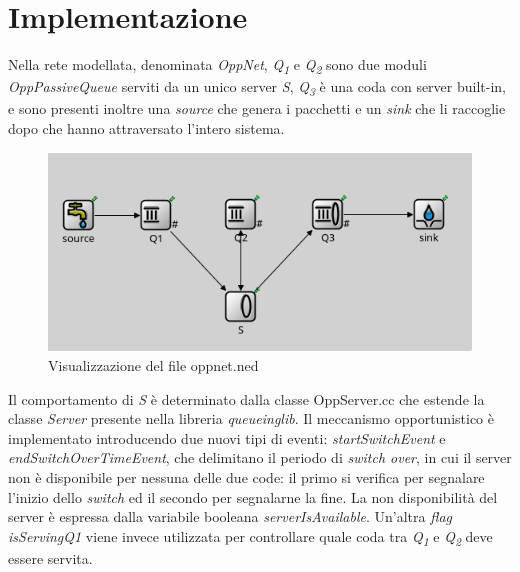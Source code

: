 \documentclass[a4paper,11pt]{article}
\begin{document}
\section{Implementazione}

Nella rete modellata, denominata \textit{OppNet}, \textit{Q\textsubscript{1}} e \textit{Q\textsubscript{2}} sono due moduli \textit{OppPassiveQueue} serviti da un unico server \textit{S}, \textit{Q\textsubscript{3}} è una coda con server built-in, e sono presenti inoltre una \textit{source} che genera i pacchetti e un \textit{sink} che li raccoglie dopo che hanno attraversato l'intero sistema.\newline

\begin{figure}[h!]
    \centering
    \includegraphics[width=\linewidth]{images/oppnet-mymodel.png}
    \caption{Visualizzazione del file oppnet.ned}
    \label{fig:2}
\end{figure}

Il comportamento di \textit{S} è determinato dalla classe OppServer.cc che estende la classe \textit{Server} presente nella libreria \textit{queueinglib}.\newline
Il meccanismo opportunistico è implementato introducendo due nuovi tipi di eventi: \textit{startSwitchEvent} e \textit{endSwitchOverTimeEvent}, che delimitano il periodo di \textit{switch over}, in cui il server non è disponibile per nessuna delle due code: il primo si verifica per segnalare l'inizio dello \textit{switch} ed il secondo per segnalarne la fine.\newline
La non disponibilità del server è espressa dalla variabile booleana \textit{serverIsAvailable}.\newline
Un'altra \textit{flag} \textit{isServingQ1} viene invece utilizzata per controllare quale coda tra \textit{Q\textsubscript{1}} e \textit{Q\textsubscript{2}} deve essere servita.
\end{document}
